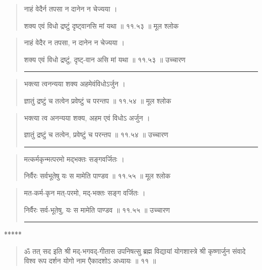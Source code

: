 \begin{quotation} 

नाहं वेदैर्न तपसा न दानेन न चेज्यया  ।  

शक्य एवं विधो द्रष्टुं दृष्ट्वानसि मां यथा  ॥ ११.५३ ॥  मूल श्लोक
\end{quotation}

\begin{quotation}

नाहं वेदैर न तपसा, न दानेन न चेज्यया  ।  

शक्य एवं विधो द्रष्टुं, दृष्ट्-वान असि मां यथा  ॥ ११.५३ ॥  उच्चारण

\noindent\rule{16cm}{0.4pt} 
\end{quotation}


\begin{quotation} 

भक्त्या त्वनन्यया शक्य अहमेवंविधोऽर्जुन  ।  

ज्ञातुं द्रष्टुं च तत्वेन प्रवेष्टुं च परन्तप  ॥ ११.५४ ॥  मूल श्लोक
\end{quotation}

\begin{quotation}

भक्त्या त्व अनन्यया शक्य, अहम एवं विधोऽ अर्जुन  ।  

ज्ञातुं द्रष्टुं च तत्वेन, प्रवेष्टुं च परन्तप  ॥ ११.५४ ॥  उच्चारण

\noindent\rule{16cm}{0.4pt} 
\end{quotation}


\begin{quotation} 

मत्कर्मकृन्मत्परमो मद्भक्तः सङ्‍गवर्जितः  ।  

निर्वैरः सर्वभूतेषु यः स मामेति पाण्डव  ॥ ११.५५ ॥  मूल श्लोक
\end{quotation}

\begin{quotation}

मत-कर्म-कृन  मत्-परमो, मद्-भक्तः सङ्‍ग वर्जितः  ।  

निर्वैरः सर्व-भूतेषु, यः स मामेति पाण्डव  ॥ ११.५५ ॥  उच्चारण

\noindent\rule{16cm}{0.4pt} 
\end{quotation}

\begin{center} ***** \end{center}
\begin{quotation} 



ॐ तत् सद इति श्री मद्-भगवद्-गीतास उपनिषत्सु ब्रह्म विद्यायां योगशास्त्रे श्री कृष्णार्जुन संवादे विश्व रूप दर्शन योगो नाम एैकादशोऽ अध्यायः  ॥  ११  ॥ 


\end{quotation} 